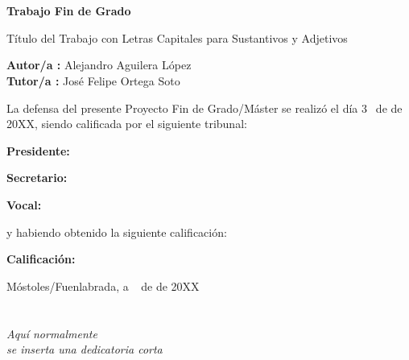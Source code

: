 \documentclass[a4paper, 12pt]{book}
\begin{document}
\newpage
\mbox{}
\thispagestyle{empty} %


\clearpage
{}
\chapter*{}

\vspace{-4cm}
\begin{center}
\LARGE
\textbf{Trabajo Fin de Grado}

\vspace{1cm}
\large
Título del Trabajo con Letras Capitales para Sustantivos y Adjetivos

\vspace{1cm}
\large
\textbf{Autor/a :} Alejandro Aguilera López  \\
\textbf{Tutor/a :} José Felipe Ortega Soto

\end{center}

\vspace{1cm}
La defensa del presente Proyecto Fin de Grado/Máster se realizó el día 3\qquad$\;\,$ de
\qquad\qquad\qquad\qquad \newline de 20XX, siendo calificada por el siguiente tribunal:


\vspace{0.5cm}
\textbf{Presidente:}

\vspace{0.8cm}
\textbf{Secretario:}

\vspace{0.8cm}
\textbf{Vocal:}


\vspace{0.8cm}
y habiendo obtenido la siguiente calificación:

\vspace{0.8cm}
\textbf{Calificación:}


\vspace{0.8cm}
\begin{flushright}
Móstoles/Fuenlabrada, a \qquad$\;\,$ de \qquad\qquad\qquad\qquad de 20XX
\end{flushright}


\chapter*{}
\begin{flushright}
\textit{Aquí normalmente \\
se inserta una dedicatoria corta \\}
\end{flushright}
\end{document}
